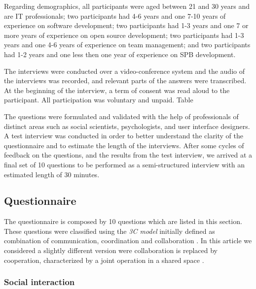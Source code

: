 \documentclass{sigchi}
\begin{document}
Regarding demographics, all participants were aged between 21 and 30 years and are IT professionals; two participants had 4-6 years and one 7-10 years of experience on software development; two participants had 1-3 years and one 7 or more years of experience on open source development; two participants had 1-3 years and one 4-6 years of experience on team management; and two participants had 1-2 years and one less then one year of experience on SPB development.

The interviews were conducted over a video-conference system and the audio of the interviews was recorded, and relevant parts of the answers were transcribed. At the beginning of the interview, a term of consent \cite{usability.gov_2015} was read aloud to the participant. All participation was voluntary and unpaid. Table 

The questions were formulated and validated with the help of professionals of distinct areas such as social scientists, psychologists, and user interface designers.  A test interview was conducted in order to better understand the clarity of the questionnaire and to estimate the length of the interviews. After some cycles of feedback on the questions, and the results from the test interview, we arrived at a final set of 10 questions to be performed as a semi-structured interview with an estimated length of 30 minutes. 

\subsection{Questionnaire}
The questionnaire is composed by 10 questions which are listed in this section. These questions were classified using the \textit{3C model} initially defined as combination of communication, coordination and collaboration \cite{Ellis1991}. In this article we considered a slightly different version were collaboration is replaced by cooperation, characterized by a joint operation in a shared space \cite{Fuks2005}.

\subsubsection{Social interaction}
\end{document}
